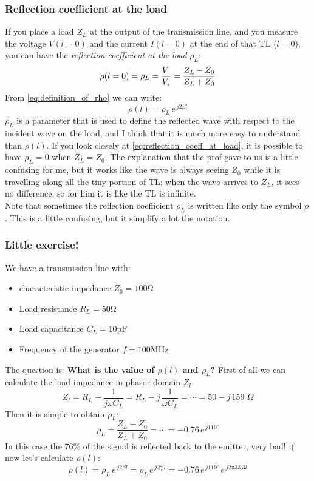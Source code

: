 \subsubsection*{Reflection coefficient at the load}
If you place a load $Z_L$ at the output of the transmission line, and you measure the voltage $V(l=0)$ and the current $I(l=0)$ at the end of that TL ($l=0$), you can have the \emph{reflection coefficient at the load} $\rho_L$:
\begin{equation}\label{eq:reflection_coeff_at_load}
    \rho(l=0)=\rho_L=\frac{V\bottomMinus}{V\bottomPlus}=\frac{Z_L-Z_0}{Z_L+Z_0}
\end{equation}
From \cref{eq:definition_of_rho} we can write:
\begin{equation}\label{eq:reflection_coeff_at_load2}
    \rho(l)=\rho_L\,e^{\,j2\beta l}
\end{equation}
$\rho_L$ is a parameter that is used to define the reflected wave with respect to the
incident wave on the load, and I think that it is much more easy to understand than $\rho(l)$.
If you look closely at \cref{eq:reflection_coeff_at_load}, it is possible to have $\rho_L=0$ when $Z_L=Z_0$. The explanation that the prof gave to us is a little confusing for me, but it works like the wave is always seeing $Z_0$ while it is travelling along all the tiny portion of TL; when the wave arrives to $Z_L$, it sees no difference, so for him it is like the TL is infinite.\\
Note that sometimes the reflection coefficient $\rho_L$ is written like only the symbol $\rho$. This is a little confusing, but it simplify a lot the notation.
\subsubsection*{Little exercise!}
We have a transmission line with:
\begin{itemize}
    \item characteristic impedance $Z_0 = 100 \si{\ohm}$
    \item Load resistance $R_L=50 \si{\ohm}$ 
    \item Load capacitance $C_L=10 \si{\pico\farad}$
    \item Frequency of the generator $f=100\si{\mega\hertz}$
\end{itemize}
The question is: \textbf{What is the value of $\rho(l)$ and $\rho_L$?}
First of all we can calculate the load impedance in phasor domain $Z_l$
\begin{equation*}
    Z_l=R_L+\frac{1}{j\omega C_L}=R_L-j\,\frac{1}{\omega C_L}=\cdots =50-j\,159\;\Omega
\end{equation*}
Then it is simple to obtain $\rho_L$:
\begin{equation*}
    \rho_L =\frac{Z_L-Z_0}{Z_L+Z_0}=\cdots =-0.76\,e^{\,j119^{\circ}}
\end{equation*}
In this case the 76\% of the signal is reflected back to the emitter, very bad! :(\\
now let's calculate $\rho(l)$:
\begin{equation*}
    \rho(l)=\rho_L\,e^{\,j2\beta l}=\rho_L\,e^{\,j2\frac{\omega}{c} l}=-0.76\,e^{\,j119^{\circ}}\,e^{\,j 2\pi 33.3 l}
\end{equation*}
